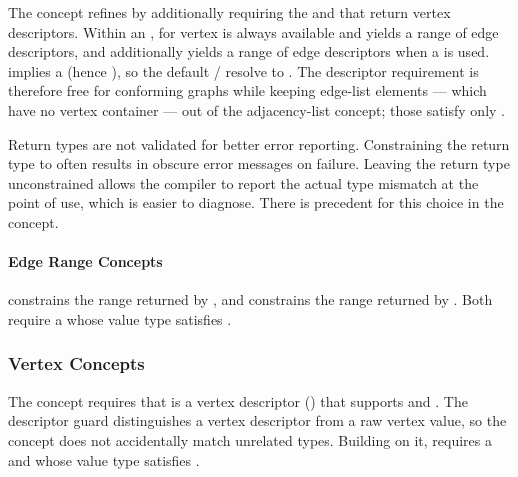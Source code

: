 
The  concept refines  by additionally requiring the  
and  that return vertex descriptors. Within an ,  
for vertex  is always available and yields a range of edge descriptors, and  
additionally yields a range of edge descriptors when a  is used.
 implies a  (hence ), so the default
/ resolve to . The descriptor
requirement is therefore free for conforming graphs while keeping edge-list elements --- which have no
vertex container --- out of the adjacency-list  concept; those satisfy only .
{\small
     
}

Return types are not validated for better error reporting. Constraining the return type to
 often results in obscure error messages on failure. Leaving the return type unconstrained allows the compiler to
report the actual type mismatch at the point of use, which is easier to diagnose. There is precedent for this choice in the
\href{https://en.cppreference.com/w/cpp/ranges/sized_range}{} concept.

\paragraph{Edge Range Concepts}

 constrains the range returned by , and  constrains
the range returned by . Both require a  whose value type
satisfies .
{\small
     
}

\subsubsection{Vertex Concepts}
The  concept requires that  is a vertex descriptor ()
that supports  and . The descriptor guard distinguishes a
vertex descriptor from a raw vertex value, so the concept does not accidentally match unrelated types.
Building on it,  requires a  and  whose
value type satisfies .


